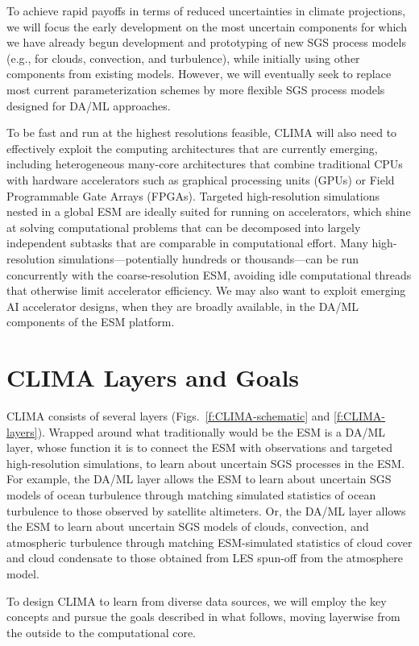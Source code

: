 \documentclass{article}
\begin{document}
To achieve rapid payoffs in terms of reduced uncertainties in climate projections, we will focus the early development on the most uncertain components for which we have already begun development and prototyping of new SGS process models (e.g., for clouds, convection, and turbulence), while initially using other components from existing models. However, we will eventually seek to replace most current parameterization schemes by more flexible SGS process models designed for DA/ML approaches. 

To be fast and run at the highest resolutions feasible, CLIMA will also need to effectively exploit the computing architectures that are currently emerging, including heterogeneous many-core architectures that combine traditional CPUs with hardware accelerators such as graphical processing units (GPUs) or Field Programmable Gate Arrays (FPGAs). Targeted high-resolution simulations nested in a global ESM are ideally suited for running on accelerators, which shine at solving computational problems that can be decomposed into largely independent subtasks that are comparable in computational effort. Many high-resolution simulations---potentially hundreds or thousands---can be run concurrently with the coarse-resolution ESM, avoiding idle computational threads that otherwise limit accelerator efficiency. We may also want to exploit emerging AI accelerator designs, when they are broadly available, in the DA/ML components of the ESM platform.

\section{CLIMA Layers and Goals}

CLIMA consists of several layers (Figs.~\ref{f:CLIMA-schematic} and \ref{f:CLIMA-layers}). Wrapped around what traditionally would be the ESM is a DA/ML layer, whose function it is to connect the ESM with observations and targeted high-resolution simulations, to learn about uncertain SGS processes in the ESM. For example, the DA/ML layer allows the ESM to learn about uncertain SGS models of ocean turbulence through matching simulated statistics of ocean turbulence to those observed by satellite altimeters. Or, the DA/ML layer allows the ESM to learn about uncertain SGS models of clouds, convection, and atmospheric turbulence through matching ESM-simulated statistics of cloud cover and cloud condensate to those obtained from LES spun-off from the atmosphere model.

To design CLIMA to learn from diverse data sources, we will employ the key concepts and pursue the goals described in what follows, moving layerwise from the outside to the computational core.
\end{document}
